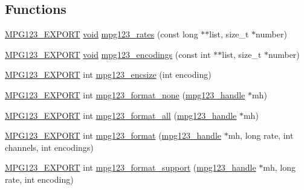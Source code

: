 \subsection*{Functions}
\begin{DoxyCompactItemize}
\item 
\mbox{\hyperlink{mpg123_8h_a2ba98cfba3f760879df70e755b2a61cc}{M\+P\+G123\+\_\+\+E\+X\+P\+O\+RT}} \mbox{\hyperlink{_s_d_l__opengles2__gl2ext_8h_ae5d8fa23ad07c48bb609509eae494c95}{void}} \mbox{\hyperlink{group__mpg123__output_gac01392beb95e85d2ba165d4a3630f52a}{mpg123\+\_\+rates}} (const long $\ast$$\ast$list, size\+\_\+t $\ast$number)
\item 
\mbox{\hyperlink{mpg123_8h_a2ba98cfba3f760879df70e755b2a61cc}{M\+P\+G123\+\_\+\+E\+X\+P\+O\+RT}} \mbox{\hyperlink{_s_d_l__opengles2__gl2ext_8h_ae5d8fa23ad07c48bb609509eae494c95}{void}} \mbox{\hyperlink{group__mpg123__output_gabdf7009c888364527de2bdf37aa36185}{mpg123\+\_\+encodings}} (const int $\ast$$\ast$list, size\+\_\+t $\ast$number)
\item 
\mbox{\hyperlink{mpg123_8h_a2ba98cfba3f760879df70e755b2a61cc}{M\+P\+G123\+\_\+\+E\+X\+P\+O\+RT}} int \mbox{\hyperlink{group__mpg123__output_gaf12bd45d9040973c8c7b7b9411a530b5}{mpg123\+\_\+encsize}} (int encoding)
\item 
\mbox{\hyperlink{mpg123_8h_a2ba98cfba3f760879df70e755b2a61cc}{M\+P\+G123\+\_\+\+E\+X\+P\+O\+RT}} int \mbox{\hyperlink{group__mpg123__output_ga931ca238347de394901c3baa13e7a8f8}{mpg123\+\_\+format\+\_\+none}} (\mbox{\hyperlink{group__mpg123__init_ga6728e2839a395f3a07d4514da659faca}{mpg123\+\_\+handle}} $\ast$mh)
\item 
\mbox{\hyperlink{mpg123_8h_a2ba98cfba3f760879df70e755b2a61cc}{M\+P\+G123\+\_\+\+E\+X\+P\+O\+RT}} int \mbox{\hyperlink{group__mpg123__output_ga65a28420ccab9021abd44ae95db8b1b6}{mpg123\+\_\+format\+\_\+all}} (\mbox{\hyperlink{group__mpg123__init_ga6728e2839a395f3a07d4514da659faca}{mpg123\+\_\+handle}} $\ast$mh)
\item 
\mbox{\hyperlink{mpg123_8h_a2ba98cfba3f760879df70e755b2a61cc}{M\+P\+G123\+\_\+\+E\+X\+P\+O\+RT}} int \mbox{\hyperlink{group__mpg123__output_gadad5794afc300a997e517dbe397dc2c7}{mpg123\+\_\+format}} (\mbox{\hyperlink{group__mpg123__init_ga6728e2839a395f3a07d4514da659faca}{mpg123\+\_\+handle}} $\ast$mh, long rate, int channels, int encodings)
\item 
\mbox{\hyperlink{mpg123_8h_a2ba98cfba3f760879df70e755b2a61cc}{M\+P\+G123\+\_\+\+E\+X\+P\+O\+RT}} int \mbox{\hyperlink{group__mpg123__output_gae30accfd052c88aad47820c5bb149cda}{mpg123\+\_\+format\+\_\+support}} (\mbox{\hyperlink{group__mpg123__init_ga6728e2839a395f3a07d4514da659faca}{mpg123\+\_\+handle}} $\ast$mh, long rate, int encoding)

\end{DoxyCompactItemize}
